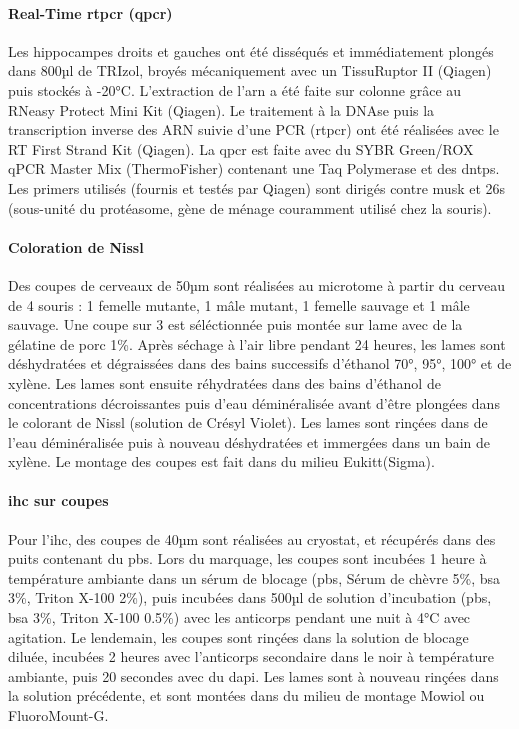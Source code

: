 \paragraph{Real-Time \acrshort{rtpcr} (\acrshort{qpcr})}
\label{par:qPCR}
	Les hippocampes droits et gauches ont été disséqués et immédiatement plongés dans 800µl de TRIzol\textregistered, broyés mécaniquement avec un TissuRuptor II (Qiagen\textregistered) puis stockés à -20°C. L'extraction de l'\acrshort{arn} a été faite sur colonne grâce au RNeasy Protect Mini Kit (Qiagen\textregistered). Le traitement à la DNAse puis la transcription inverse des ARN suivie d'une PCR (\acrshort{rtpcr}) ont été réalisées avec le RT First Strand Kit (Qiagen\textregistered). La \gls{qpcr} est faite avec du SYBR Green/ROX qPCR Master Mix (ThermoFisher\textregistered) contenant une Taq Polymerase et des \glspl{dntp}. Les primers utilisés (fournis et testés par Qiagen\textregistered) sont dirigés contre \gls{musk} et \acrshort{26s} (sous-unité du protéasome, gène de ménage couramment utilisé chez la souris).
	
\paragraph{Coloration de Nissl}
\label{par:Nissl}
	Des coupes de cerveaux de 50µm sont réalisées au microtome à partir du cerveau de 4 souris : 1 femelle mutante, 1 mâle mutant, 1 femelle sauvage et 1 mâle sauvage. Une coupe sur 3 est séléctionnée puis montée sur lame avec de la gélatine de porc 1\%. Après séchage à l'air libre pendant 24 heures, les lames sont déshydratées et dégraissées dans des bains successifs d'éthanol 70°, 95°, 100° et de xylène. Les lames sont ensuite réhydratées dans des bains d'éthanol de concentrations décroissantes puis d'eau déminéralisée avant d'être plongées dans le colorant de Nissl (solution de Crésyl Violet).  Les lames sont rinçées dans de l'eau déminéralisée puis à nouveau déshydratées et immergées dans un bain de xylène. Le montage des coupes est fait dans du milieu Eukitt\textregistered (Sigma).
	
\paragraph{\Acrlong{ihc} sur coupes}	
\label{par:ihccoupe}
	Pour l'\Gls{ihc}, des coupes de 40µm sont réalisées au cryostat, et récupérés dans des puits contenant du \acrshort{pbs}. Lors du marquage, les coupes sont incubées 1 heure à température ambiante dans un sérum de blocage (\acrshort{pbs}, Sérum de chèvre 5\%, \acrshort{bsa} 3\%, Triton X-100 2\%), puis  incubées dans 500µl de solution d'incubation (\acrshort{pbs}, \acrshort{bsa} 3\%, Triton X-100 0.5\%) avec les anticorps pendant une nuit à 4°C avec agitation. Le lendemain, les coupes sont rinçées dans la solution de blocage diluée, incubées 2 heures avec l'anticorps secondaire dans le noir à température ambiante, puis 20 secondes avec du \gls{dapi}. Les lames sont à nouveau rinçées dans la solution précédente, et sont montées dans du milieu de montage Mowiol ou FluoroMount-G\textregistered.
	
